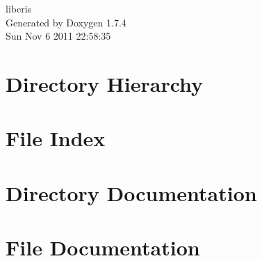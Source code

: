 \documentclass[a4paper]{book}
\begin{document}
\hypersetup{pageanchor=false}
\begin{titlepage}
\vspace*{7cm}
\begin{center}
{\Large liberis }\\
\vspace*{1cm}
{\large Generated by Doxygen 1.7.4}\\
\vspace*{0.5cm}
{\small Sun Nov 6 2011 22:58:35}\\
\end{center}
\end{titlepage}
\clearemptydoublepage
{}
\tableofcontents
\clearemptydoublepage
{}
\hypersetup{pageanchor=true}
\chapter{Directory Hierarchy}

\chapter{File Index}

\chapter{Directory Documentation}



\chapter{File Documentation}













\printindex
\end{document}
